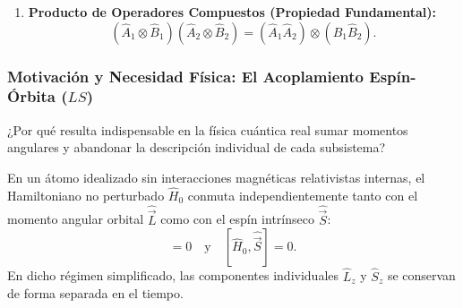 \begin{teoremabox}
\begin{enumerate}
        \begin{equation}
            \sum_{i=1}^{N_1} \sum_{j=1}^{N_2} \ket{u_i, v_j}\bra{u_i, v_j} = \hat{I}_1 \otimes \hat{I}_2 = \hat{I}.
        \end{equation}
        \item \textbf{Producto de Operadores Compuestos (Propiedad Fundamental):}
        \begin{equation}
            \boxed{(\hat{A}_1 \otimes \hat{B}_1)(\hat{A}_2 \otimes \hat{B}_2) = (\hat{A}_1\hat{A}_2) \otimes (\hat{B}_1\hat{B}_2)}.
            \label{eq:operator_tensor_product_rule}
        \end{equation}
    \end{enumerate}
\end{teoremabox}

\subsubsection{Motivación y Necesidad Física: El Acoplamiento Espín-Órbita ($LS$)}
\label{subsec:acoplamiento_espin_orbita}

¿Por qué resulta indispensable en la física cuántica real sumar momentos angulares y abandonar la descripción individual de cada subsistema?

En un átomo idealizado sin interacciones magnéticas relativistas internas, el Hamiltoniano no perturbado $\hat{H}_0$ conmuta independientemente tanto con el momento angular orbital $\hat{\vec{L}}$ como con el espín intrínseco $\hat{\vec{S}}$:
\begin{equation}
    [\hat{H}_0, \hat{\vec{L}}] = 0 \quad \text{y} \quad [\hat{H}_0, \hat{\vec{S}}] = 0.
\end{equation}
En dicho régimen simplificado, las componentes individuales $\hat{L}_z$ y $\hat{S}_z$ se conservan de forma separada en el tiempo.

